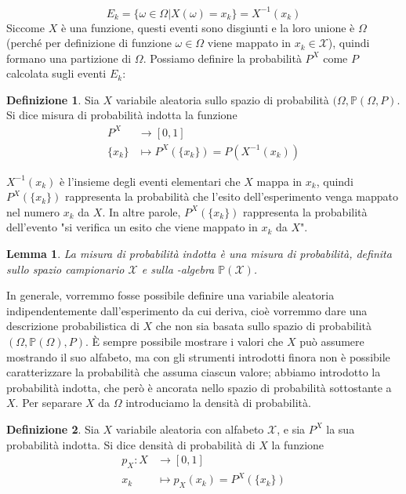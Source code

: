 \documentclass{article}
\theoremstyle{plain}
\newtheorem{lemma}{Lemma}[section]
\theoremstyle{definition}
\newtheorem{definizione}{Definizione}[section]
\theoremstyle{remark}
\newcommand{\uline}[1]{%
  \ul{{\phantom{#1}}}%
  \llap{\contour{white}{#1}}%
}
\begin{document}
\begin{equation*}
	E_k=\{\omega\in\Omega|X(\omega)=x_k\}=X^{-1}(x_k)
\end{equation*}
Siccome $X$ è una funzione, questi eventi sono disgiunti e la loro unione è $\Omega$ (perché per definizione di funzione \uline{ogni} $\omega\in\Omega$ viene mappato in \uline{uno e un solo} $x_k\in\mathcal{X}$), quindi formano una partizione di $\Omega$. Possiamo definire la probabilità $P^X$ come $P$ calcolata sugli eventi $E_k$:
\begin{definizione}
	Sia $X$ variabile aleatoria sullo spazio di probabilità $(\Omega,\mathds{P}(\Omega,P)$. Si dice misura di probabilità indotta la funzione
	\begin{align*}
		P^X&\to [0,1]\\
		\{x_k\}&\mapsto P^X(\{x_k\})=P(X^{-1}(x_k))
	\end{align*}
\end{definizione}
$X^{-1}(x_k)$ è l'insieme degli eventi elementari che $X$ mappa in $x_k$, quindi $P^X(\{x_k\})$ rappresenta la probabilità che l'esito dell'esperimento venga mappato nel numero $x_k$ da $X$. In altre parole, $P^X(\{x_k\})$ rappresenta la probabilità dell'evento "si verifica un esito che viene mappato in $x_k$ da $X$".
\begin{lemma}
	La misura di probabilità indotta è una misura di probabilità, definita sullo spazio campionario $\mathcal{X}$ e sulla \sigma-algebra $\mathds{P}(\mathcal{X})$.
\end{lemma}
In generale, vorremmo fosse possibile definire una variabile aleatoria indipendentemente dall'esperimento da cui deriva, cioè vorremmo dare una descrizione probabilistica di $X$ che non sia basata sullo spazio di probabilità $(\Omega, \mathds{P}(\Omega),P)$. È sempre possibile mostrare i valori che $X$ può assumere mostrando il suo alfabeto, ma con gli strumenti introdotti finora non è possibile caratterizzare la probabilità che assuma ciascun valore; abbiamo introdotto la probabilità indotta, che però è ancorata nello spazio di probabilità sottostante a $X$. Per separare $X$ da $\Omega$ introduciamo la densità di probabilità.
\begin{definizione}
	Sia $X$ variabile aleatoria con alfabeto $\mathcal{X}$, e sia $P^X$ la sua probabilità indotta. Si dice densità di probabilità di $X$ la funzione
	\begin{align*}
		p_X:X&\to[0,1]\\
		x_k&\mapsto p_X(x_k)=P^X(\{x_k\})
	\end{align*}
\end{definizione}
\end{document}
